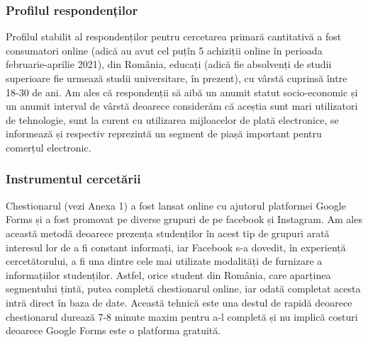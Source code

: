 \documentclass[a4paper, 12pt]{article}
\begin{document}
	\subsubsection{Profilul respondenților}
	\qquad Profilul stabilit al respondenților pentru cercetarea primară cantitativă a fost consumatori online (adică au avut cel puțîn 5 achiziții online în perioada februarie-aprilie 2021), din România, educați (adică fie absolvenți de studii superioare fie urmează studii universitare, în prezent), cu vârstă cuprinsă între 18-30 de ani. Am ales că respondenții să aibă un anumit statut socio-economic și un anumit interval de vârstă deoarece considerăm că aceștia sunt mari utilizatori de tehnologie, sunt la curent cu utilizarea mijloacelor de plată electronice, se informează și respectiv reprezintă un segment de piașă important pentru comerțul electronic.
	\subsubsection{Instrumentul cercetării}
		\qquad  Chestionarul (vezi Anexa 1) a fost lansat online cu ajutorul platformei Google Forms și a fost promovat  pe diverse grupuri de pe facebook și Instagram. Am ales această metodă deoarece prezența studenților în acest tip de grupuri arată interesul lor de a fi constant informați, iar Facebook s-a dovedit, în experiență cercetătorului, a fi una dintre cele mai utilizate modalități de furnizare a informațiilor studenților. Astfel, orice student din România, care aparținea segmentului țintă, putea completă chestionarul online, iar odată completat acesta intră direct în baza de date. Această tehnică este una destul de rapidă deoarece chestionarul durează 7-8 minute maxim pentru a-l completă și nu implică costuri deoarece Google Forms este o platforma gratuită.
\end{document}
